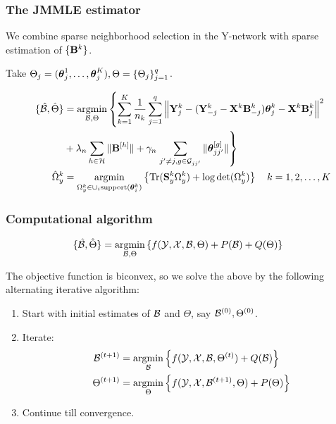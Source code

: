 \documentclass[10pt]{beamer}
\theoremstyle{definition}
\DeclareMathOperator*{\Tr}{Tr}
\DeclareMathOperator*{\argmin}{argmin}
\begin{document}
\begin{frame}
\frametitle{The JMMLE estimator}
We combine sparse neighborhood selection in the Y-network with sparse estimation of $\{ {\mathbf{B}}^k \}$.

Take $\Theta_j = ({\boldsymbol{\theta}}_j^1, \ldots, {\boldsymbol{\theta}}_j^K), \Theta = \{ \Theta_j \}_{j=1}^q$.

\begin{align*}
\{ \hat \cB, \hat \Theta \} &=
\argmin_{\cB, \Theta} \left\{ \sum_{k=1}^K \frac{1}{n_k} \sum_{j=1}^q
\left\| \bfY_j^k - ( \bfY_{-j}^k - \bfX^k \bfB_{-j}^k) \bftheta_j^k
- \bfX^k \bfB_j^k \right\|^2 \right.\\
& + \lambda_n \sum_{h \in \cH} \| \bfB^{[h]} \|
+ \gamma_n \left. \sum_{j' \neq j, g \in \cG_{jj'}} \| \bftheta_{jj'}^{[g]} \| \right\}\\
\hat \Omega_y^k &= \argmin_{\Omega_y^k \in \cup_i \text{support} (\bftheta_i^k)}
\left\{ \Tr (\bfS_y^k \Omega_y^k ) + \log \det (\Omega_y^k ) \right\}
\quad k = 1, 2, \ldots, K
\end{align*}
\end{frame}
\begin{frame}
\frametitle{Computational algorithm}
\begin{align*}
\{ \hat \cB, \hat \Theta \} &= \argmin_{\cB, \Theta}
\left\{ f(\cY, \cX, \cB, \Theta) + P(\cB) + Q(\Theta) \right\}
\end{align*}

The objective function is biconvex, so we solve the above by the following alternating iterative algorithm:

\begin{enumerate}
\item Start with initial estimates of ${\cal{B}}$ and $\Theta$, say ${\cal{B}}^{(0)}, \Theta^{(0)}$.
\item Iterate:
%
\begin{align*}
\cB^{(t+1)} &= \argmin_\cB \left\{ f ( \cY, \cX, \cB, \Theta^{(t)}) + Q (\cB) \right\}\\
\Theta^{(t+1)} &= \argmin_\Theta \left\{ f ( \cY, \cX, \cB^{(t+1)}, \Theta) + P (\Theta) \right\}
\end{align*}
\item Continue till convergence.
\end{enumerate}
\end{frame}
\end{document}
